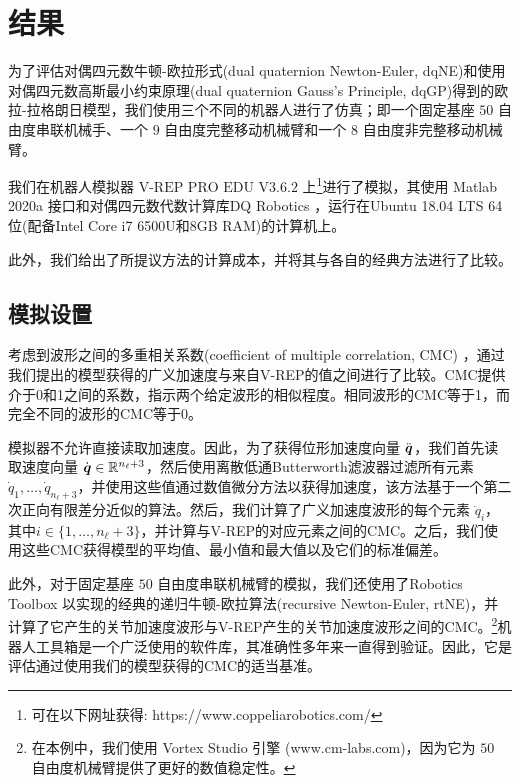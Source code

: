 
\section{\normalfont\bfseries 结果 \label{sec:Results}}

为了评估对偶四元数牛顿-欧拉形式(dual quaternion Newton-Euler, dqNE)和使用对偶四元数高斯最小约束原理(dual quaternion Gauss's Principle, dqGP)得到的欧拉-拉格朗日模型，我们使用三个不同的机器人进行了仿真；即一个固定基座 $50$ 自由度串联机械手、一个 $9$ 自由度完整移动机械臂和一个 $8$ 自由度非完整移动机械臂。

我们在机器人模拟器 ${\text{V-REP PRO EDU V3.6.2}}$ 上\footnote{可在以下网址获得: https://www.coppeliarobotics.com/}进行了模拟，其使用 Matlab 2020a 接口和对偶四元数代数计算库DQ Robotics \cite{AdornoDQRobotics2020}，运行在Ubuntu 18.04 LTS 64 位(配备Intel Core i7 6500U和8GB RAM)的计算机上。 

此外，我们给出了所提议方法的计算成本，并将其与各自的经典方法进行了比较。

\subsection{\normalfont\bfseries 模拟设置}

考虑到波形之间的多重相关系数(coefficient of multiple correlation, CMC) \cite{Ferrari2010}，通过我们提出的模型获得的广义加速度与来自V-REP的值之间进行了比较。CMC提供介于0和1之间的系数，指示两个给定波形的相似程度。相同波形的CMC等于1，而完全不同的波形的CMC等于0。

模拟器不允许直接读取加速度。因此，为了获得位形加速度向量 $\ddot{\boldsymbol{q}}$，我们首先读取速度向量 $\dot{\boldsymbol{q}}\in\mathbb{R}^{n_{\ell}+3}$，然后使用离散低通Butterworth滤波器过滤所有元素 $\dot{q}_{1},\ldots,\dot{q}_{n_{\ell}+3}$，并使用这些值通过数值微分方法以获得加速度，该方法基于一个第二次正向有限差分近似的算法。然后，我们计算了广义加速度波形的每个元素 $\ddot{q}_{i}$，其中$i\in\{1,\ldots,n_{\ell}+3\}$，并计算与V-REP的对应元素之间的CMC。之后，我们使用这些CMC获得模型的平均值、最小值和最大值以及它们的标准偏差。

此外，对于固定基座 $50$ 自由度串联机械臂的模拟，我们还使用了Robotics Toolbox \cite{Corke2017} 以实现的经典的递归牛顿-欧拉算法(recursive Newton-Euler, rtNE)，并计算了它产生的关节加速度波形与V-REP产生的关节加速度波形之间的CMC。\footnote{在本例中，我们使用 Vortex Studio 引擎 (www.cm-labs.com)，因为它为 $50$ 自由度机械臂提供了更好的数值稳定性。}机器人工具箱是一个广泛使用的软件库，其准确性多年来一直得到验证。因此，它是评估通过使用我们的模型获得的CMC的适当基准。

